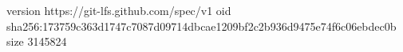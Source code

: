 version https://git-lfs.github.com/spec/v1
oid sha256:173759c363d1747c7087d09714dbcae1209bf2c2b936d9475e74f6c06ebdec0b
size 3145824
